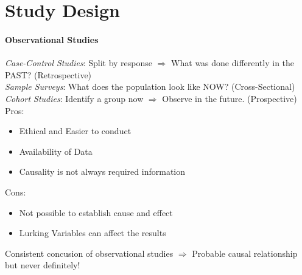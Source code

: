 \section{Study Design}
\paragraph{Observational Studies}
\textsl{Case-Control Studies}: Split by response $\Rightarrow$ What was done differently in the PAST? (Retrospective)\\
\textsl{Sample Surveys}: What does the population look like NOW? (Cross-Sectional)\\
\textsl{Cohort Studies}: Identify a group now $\Rightarrow$ Observe in the future. (Prospective)\\
\textcolor{OliveGreen}{Pros:}
\begin{itemize}
	\item Ethical and Easier to conduct
	\item Availability of Data
	\item Causality is not always required information
\end{itemize}
\textcolor{Bittersweet}{Cons:}
\begin{itemize}
	\item Not possible to establish cause and effect
	\item Lurking Variables can affect the results
\end{itemize}
Consistent concusion of observational studies $\Rightarrow$ \textcolor{Bittersweet}{Probable} causal
relationship but \textcolor{Bittersweet}{never definitely!}\\
